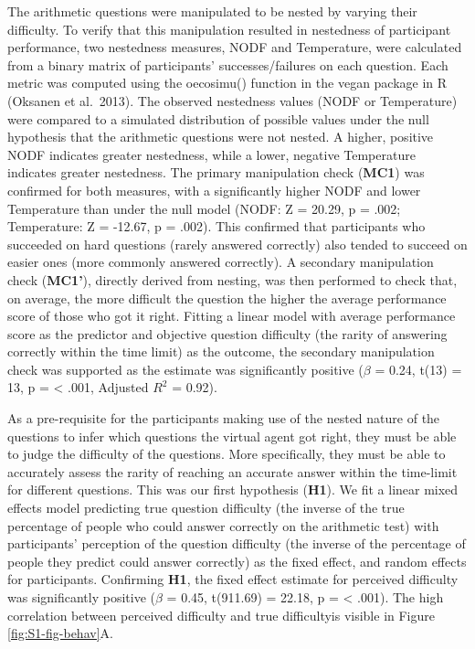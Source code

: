 \documentclass[
  10pt,
  letterpaper]{article}
\begin{document}
The arithmetic questions were manipulated to be nested by varying their difficulty. To verify that this manipulation resulted in nestedness of participant performance, two nestedness measures, NODF and Temperature, were calculated from a binary matrix of participants' successes/failures on each question. Each metric was computed using the oecosimu() function in the vegan package in R (Oksanen et al.~2013). The observed nestedness values (NODF or Temperature) were compared to a simulated distribution of possible values under the null hypothesis that the arithmetic questions were not nested. A higher, positive NODF indicates greater nestedness, while a lower, negative Temperature indicates greater nestedness. The primary manipulation check (\textbf{MC1}) was confirmed for both measures, with a significantly higher NODF and lower Temperature than under the null model (NODF: Z = 20.29, p = .002; Temperature: Z = -12.67, p = .002). This confirmed that participants who succeeded on hard questions (rarely answered correctly) also tended to succeed on easier ones (more commonly answered correctly). A secondary manipulation check (\textbf{MC1'}), directly derived from nesting, was then performed to check that, on average, the more difficult the question the higher the average performance score of those who got it right. Fitting a linear model with average performance score as the predictor and objective question difficulty (the rarity of answering correctly within the time limit) as the outcome, the secondary manipulation check was supported as the estimate was significantly positive (\(\beta\) = 0.24, t(13) = 13, p = \textless{} .001, Adjusted \(R^2\) = 0.92).

As a pre-requisite for the participants making use of the nested nature of the questions to infer which questions the virtual agent got right, they must be able to judge the difficulty of the questions. More specifically, they must be able to accurately assess the rarity of reaching an accurate answer within the time-limit for different questions. This was our first hypothesis (\textbf{H1}). We fit a linear mixed effects model predicting true question difficulty (the inverse of the true percentage of people who could answer correctly on the arithmetic test) with participants' perception of the question difficulty (the inverse of the percentage of people they predict could answer correctly) as the fixed effect, and random effects for participants. Confirming \textbf{H1}, the fixed effect estimate for perceived difficulty was significantly positive (\(\beta\) = 0.45, t(911.69) = 22.18, p = \textless{} .001). The high correlation between perceived difficulty and true difficultyis visible in Figure \ref{fig:S1-fig-behav}A.
\end{document}
